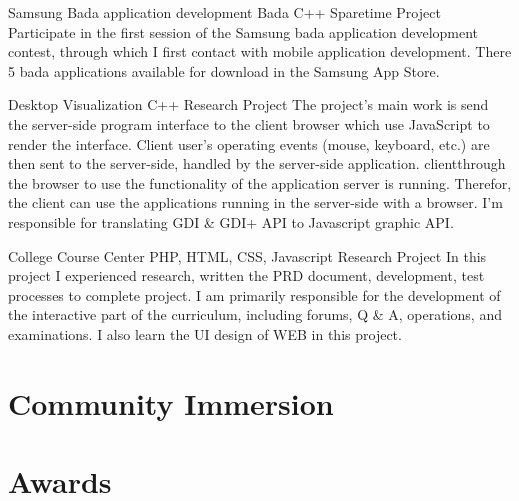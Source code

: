 \documentclass[11pt,a4paper]{moderncv}
\begin{document}
\vspace*{0.2\baselineskip}
{Samsung Bada application development}
{Bada C++}
{Sparetime Project}{}
{Participate in the first session of the Samsung bada application development contest, through which I first contact with mobile
application development. There 5 bada applications available for download in the Samsung App Store.
}

\vspace*{0.2\baselineskip}
{Desktop Visualization}
{C++}
{Research Project}{}
{The project's main work is send the server-side program interface to the client browser which use JavaScript to render the interface. 
Client user's operating events (mouse, keyboard, etc.) are then sent to the server-side, handled by the server-side application.
clientthrough the browser to use the functionality of the application server is running. Therefor, the client can use the
applications running in the server-side with a browser. I'm responsible for translating GDI \& GDI+ API to Javascript graphic API.
}

\vspace*{0.2\baselineskip}
{College Course Center}
{PHP, HTML, CSS, Javascript}
{Research Project}{}
{
In this project I experienced research, written the PRD document, development, test processes to complete project. 
I am primarily responsible for the development of the interactive part of the curriculum, including forums, Q \& A,
operations, and examinations. I also learn the UI design of WEB in this project.
}


\section{Community Immersion}

\section{Awards}



\end{document}
